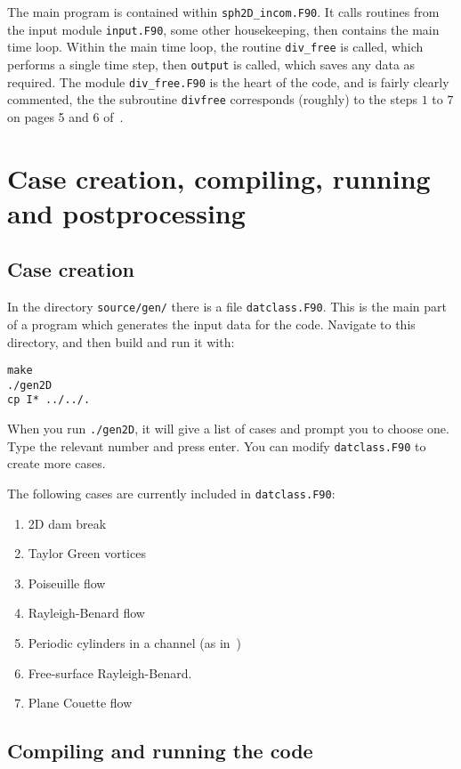 \documentclass[notitlepage]{revtex4-2}
\begin{document}
The main program is contained within \verb|sph2D_incom.F90|. It calls routines from the input module \verb|input.F90|, some other housekeeping, then contains the main time loop. Within the main time loop, the routine \verb|div_free| is called, which performs a single time step, then \verb|output| is called, which saves any data as required. The module \verb|div_free.F90| is the heart of the code, and is fairly clearly commented, the the subroutine \verb|divfree| corresponds (roughly) to the steps $1$ to $7$ on pages 5 and 6 of~\cite{king_2021}.

\section{Case creation, compiling, running and postprocessing}

\subsection{Case creation}\label{case}

In the directory \texttt{source/gen/} there is a file \texttt{datclass.F90}. This is the main part of a program which generates the input data for the code. Navigate to this directory, and then build and run it with:
\begin{verbatim}
make
./gen2D
cp I* ../../.
\end{verbatim}
When you run \verb|./gen2D|, it will give a list of cases and prompt you to choose one. Type the relevant number and press enter. You can modify \verb|datclass.F90| to create more cases.

The following cases are currently included in \verb|datclass.F90|:
\begin{enumerate}
\item 2D dam break
\item Taylor Green vortices
\item Poiseuille flow
\item Rayleigh-Benard flow
\item Periodic cylinders in a channel (as in~\cite{vazquez_2012})
\item Free-surface Rayleigh-Benard.
\item Plane Couette flow
\end{enumerate}

\subsection{Compiling and running the code}
\end{document}
